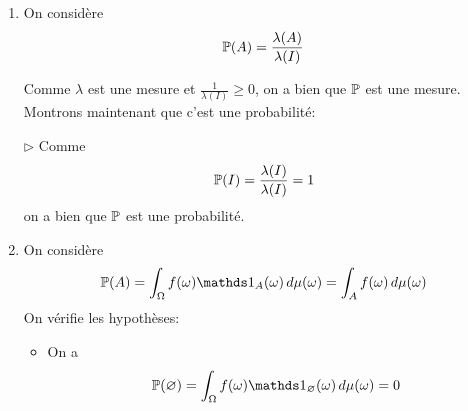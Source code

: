 {\begin{td-sol}[]
\begin{enumerate}
\begin{itemize}[label=\(\triangleright\)]
                \item On considère \({(A_k)}_{k\in\N}\) une suite d'ensembles 2 à 2
                disjoints. Alors
                \begin{equation*}
                    \begin{aligned}
                        \bb P\left(\bigcup_{k=0}^\infty A_k\right)
                        &= \sum_{n=1}^\infty a_n\bb P_n\left(\bigcup_{k=0}^\infty A_k\right) \\
                        &= \sum_{n=1}^\infty a_n \sum_{k=0}^\infty \bb P(A_k)\\
                        &= \sum_{k=0}^\infty \underbrace{\sum_{n=1}^\infty a_n\bb P_n(A_k)}_{=\bb P(A_k)}\\
                        &= \sum_{k=0}^\infty \bb P(A_k)
                    \end{aligned}
                \end{equation*}
                On rappelle qu'on peut intervertir les deux sommes car tous les éléments sont positifs

                \item Enfin, on a
                \begin{equation*}
                    \bb P(\Omega) = \sum_{n=1}^\infty a_n\underbrace{\bb P_n(\Omega)}_{=1} = \sum_{n=1}^\infty a_n = 1.
                \end{equation*}
            \end{itemize}

            \item On considère
            \begin{equation*}
                \mathbb{P}(A) = \frac{\lambda(A)}{\lambda(I)}
            \end{equation*}

            Comme \(\lambda\) est une mesure et \(\frac{1}{\lambda(I)}\ge 0\),
            on a bien que \(\mathbb{P}\) est une mesure. Montrons maintenant que c'est
            une probabilité:

            \(\triangleright\) Comme
            \begin{equation*}
                \mathbb{P}(I) = \frac{\lambda(I)}{\lambda(I)} = 1
            \end{equation*}
            on a bien que \(\mathbb{P}\) est une probabilité.

            \item On considère
            \begin{equation*}
                \bb P(A) = \int_{\Omega}f(\omega)\one_A(\omega)\der\mu(\omega) = \int_A f(\omega)\der\mu(\omega)
            \end{equation*}
            On vérifie les hypothèses:
            \begin{itemize}[label=\(\triangleright\)]
                \item On a
                \begin{equation*}
                    \bb P(\varnothing) = \int_{\Omega} f(\omega)\one_{\varnothing}(\omega)\der\mu(\omega)=0
                \end{equation*}


\end{itemize}
\end{enumerate}
\end{td-sol}}
